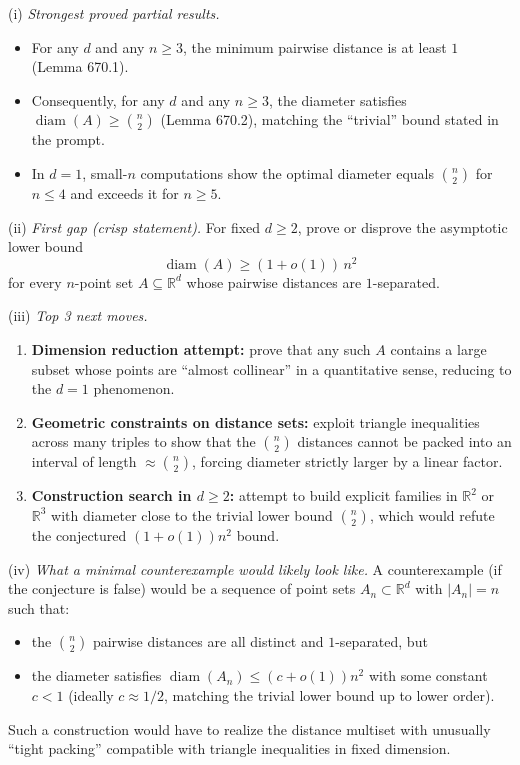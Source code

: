 \smallskip
\noindent(i) \emph{Strongest proved partial results.}
\begin{itemize}
\item For any $d$ and any $n\ge 3$, the minimum pairwise distance is at least $1$ (Lemma 670.1).
\item Consequently, for any $d$ and any $n\ge 3$, the diameter satisfies $\operatorname{diam}(A)\ge \binom n2$ (Lemma 670.2), matching the ``trivial'' bound stated in the prompt.
\item In $d=1$, small-$n$ computations show the optimal diameter equals $\binom n2$ for $n\le 4$ and exceeds it for $n\ge 5$.
\end{itemize}

\noindent(ii) \emph{First gap (crisp statement).}
For fixed $d\ge 2$, prove or disprove the asymptotic lower bound
\[
\operatorname{diam}(A) \ge (1+o(1))\,n^2
\]
for every $n$-point set $A\subseteq\mathbb{R}^d$ whose pairwise distances are $1$-separated.

\noindent(iii) \emph{Top 3 next moves.}
\begin{enumerate}
\item \textbf{Dimension reduction attempt:} prove that any such $A$ contains a large subset whose points are ``almost collinear'' in a quantitative sense, reducing to the $d=1$ phenomenon.
\item \textbf{Geometric constraints on distance sets:} exploit triangle inequalities across many triples to show that the $\binom n2$ distances cannot be packed into an interval of length $\approx \binom n2$, forcing diameter strictly larger by a linear factor.
\item \textbf{Construction search in $d\ge 2$:} attempt to build explicit families in $\mathbb{R}^2$ or $\mathbb{R}^3$ with diameter close to the trivial lower bound $\binom n2$, which would refute the conjectured $(1+o(1))n^2$ bound.
\end{enumerate}

\noindent(iv) \emph{What a minimal counterexample would likely look like.}
A counterexample (if the conjecture is false) would be a sequence of point sets $A_n\subset\mathbb{R}^d$ with $|A_n|=n$ such that:
\begin{itemize}
\item the $\binom n2$ pairwise distances are all distinct and $1$-separated, but
\item the diameter satisfies $\operatorname{diam}(A_n) \le (c+o(1))n^2$ with some constant $c<1$ (ideally $c\approx 1/2$, matching the trivial lower bound up to lower order).
\end{itemize}
Such a construction would have to realize the distance multiset with unusually ``tight packing'' compatible with triangle inequalities in fixed dimension.


